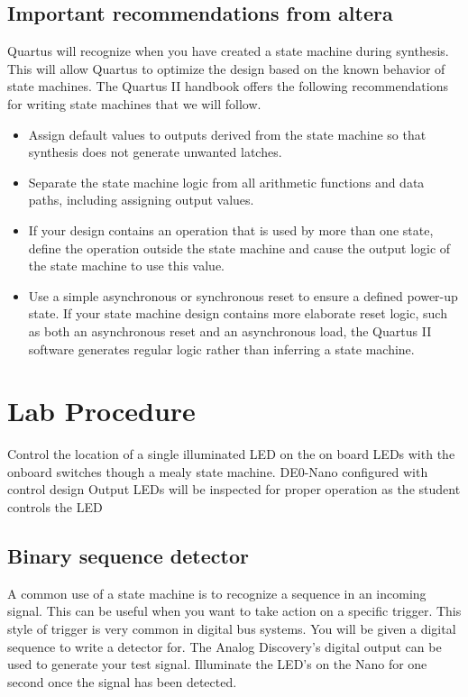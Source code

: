     \subsection{Important recommendations from altera}
      Quartus will recognize when you have created a state machine during synthesis. This will allow Quartus to optimize the design based on the known behavior of state machines. The Quartus II handbook offers the following recommendations for writing state machines that we will follow.
      \begin{itemize}
        \item Assign default values to outputs derived from the state machine so that synthesis does not generate unwanted latches.
        \item Separate the state machine logic from all arithmetic functions and data paths, including assigning output values.
        \item If your design contains an operation that is used by more than one state, define the operation outside the state machine and cause the output logic of the state machine to use this value.
        \item Use a simple asynchronous or synchronous reset to ensure a defined power-up state. If your state machine design contains more elaborate reset logic, such as both an asynchronous reset and an asynchronous load, the Quartus II software generates regular logic rather than inferring a state machine.
      \end{itemize}

\section{Lab Procedure}

    {Control the location of a single illuminated LED on the on board LEDs with the onboard switches though a mealy state machine.}
    {DE0-Nano configured with control design}
    {Output LEDs will be inspected for proper operation as the student controls the LED}

  \subsection{Binary sequence detector}
    A common use of a state machine is to recognize a sequence in an incoming signal. This can be useful when you want to take action on a specific trigger. This style of trigger is very common in digital bus systems. You will be given a digital sequence to write a detector for. The Analog Discovery's  digital output can be used to generate your test signal. Illuminate the LED's on the  Nano for one second once the signal has been detected.

